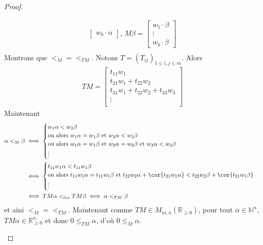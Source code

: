 \begin{proof}
\begin{enumerate}
\begin{align*}
\begin{bmatrix}
                        w_b \cdot \alpha
                    \end{bmatrix}
                    ,\, M \beta =
                    \begin{bmatrix}
                        w_1 \cdot \beta \\
                        \vdots \\
                        w_b \cdot \beta
                    \end{bmatrix} \\
                \end{align*}
                Montrons que $<_M = <_{TM}$. Notons $T = (T_{ij})_{1 \leq i,j \leq m}$. Alors
                \begin{align*}
                    TM =
                    \begin{bmatrix}
                        t_{11} w_1 \\
                        t_{21} w_1 + t_{22} w_2 \\
                        t_{31} w_1 + t_{32} w_2 + t_{33} w_3 \\
                        \vdots \\
                    \end{bmatrix}
                \end{align*}
                Maintenant
                \begin{align*}
                    \alpha <_M \beta &\iff 
                    \begin{cases}
                        w_1 \alpha < w_2 \beta \\
                        \text{ou alors } w_1\alpha = w_1 \beta \text{ et } w_2 \alpha < w_2 \beta \\
                        \text{ou alors } w_1\alpha = w_1 \beta \text{ et } w_2 \alpha = w_2 \beta \text{ et } w_3 \alpha < w_3 \beta \\
                        \vdots
                    \end{cases} \\
                    &\iff 
                    \begin{cases}
                        t_{11} w_1 \alpha < t_{11} w_1 \beta \\
                        \text{ou alors } t_{11} w_1 \alpha = t_{11} w_1 \beta \text{ et } t_{22} w_2 \alpha + \cor{t_{21} w_1 \alpha} < t_{22} w_2 \beta + \cor{t_{21} w_1 \beta} \\
                        \vdots 
                    \end{cases} \\
                    &\iff TM \alpha <_{lex} TM \beta \iff \alpha <_{TM} \beta
                \end{align*}
                et aini $<_M = <_{TM}$. Maintenant comme $TM \in M_{m,n}(\mathbb{R}_{\geq 0})$, pour tout $\alpha \in \mathbb{N}^n$, $TM\alpha \in \mathbb{R}^n_{\geq 0}$ et donc $0 \leq_{TM} \alpha$, d'où $0 \leq_M \alpha$.
            \end{enumerate}
        \end{proof}

